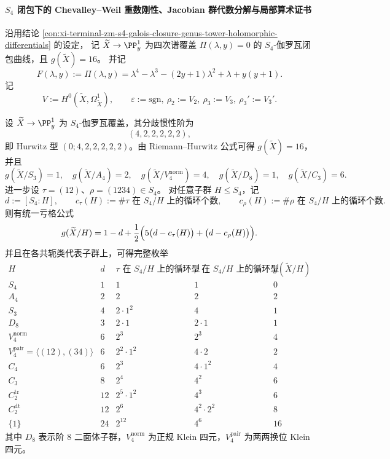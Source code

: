 \paragraph{\texorpdfstring{$S_4$}{S4} 闭包下的 Chevalley--Weil 重数刚性、Jacobian 群代数分解与局部算术证书}
沿用结论 \ref{con:xi-terminal-zm-s4-galois-closure-genus-tower-holomorphic-differentials} 的设定，
记 \(\widetilde{X}\to \PP^1_y\) 为四次谱覆盖 \(\Pi(\lambda,y)=0\) 的 \(S_4\)-伽罗瓦闭包曲线，且 \(g(\widetilde{X})=16\)。
并记
\[
F(\lambda,y):=\Pi(\lambda,y)
=\lambda^{4}-\lambda^{3}-(2y+1)\lambda^{2}+\lambda+y(y+1).
\]
记
\[
V:=H^0(\widetilde{X},\Omega^1_{\widetilde{X}}),
\qquad
\varepsilon:=\mathrm{sgn},\ \rho_2:=V_2,\ \rho_3:=V_3,\ \rho_3':=V_3'.
\]

\begin{conclusion}\label{con:xi-terminal-zm-s4-hurwitz-subgroup-spectrum-cycletypes}
设 \(\widetilde{X}\to\PP^1_y\) 为 \(S_4\)-伽罗瓦覆盖，其分歧惯性阶为
\[
(4,2,2,2,2,2),
\]
即 Hurwitz 型 \((0;4,2,2,2,2,2)\)。由 Riemann--Hurwitz 公式可得 \(g(\widetilde{X})=16\)，并且
\[
g(\widetilde{X}/S_3)=1,\quad
g(\widetilde{X}/A_4)=2,\quad
g(\widetilde{X}/V_4^{\mathrm{norm}})=4,\quad
g(\widetilde{X}/D_8)=1,\quad
g(\widetilde{X}/C_3)=6.
\]
进一步设 \(\tau=(12)\)、\(\rho=(1234)\in S_4\)。
对任意子群 \(H\le S_4\)，记
\[
d:=[S_4:H],\qquad
c_\tau(H):=\#\text{\(\tau\) 在 }S_4/H\text{ 上的循环个数},\qquad
c_\rho(H):=\#\text{\(\rho\) 在 }S_4/H\text{ 上的循环个数}.
\]
则有统一亏格公式
\[
g(\widetilde{X}/H)
=1-d+\frac12\Bigl(5\bigl(d-c_\tau(H)\bigr)+\bigl(d-c_\rho(H)\bigr)\Bigr).
\]
并且在各共轭类代表子群上，可得完整枚举
\[
\begin{array}{c|c|c|c|c}
H & d & \tau\text{ 在 }S_4/H\text{ 上的循环型} & \rho\text{ 在 }S_4/H\text{ 上的循环型} & g(\widetilde{X}/H)\\
\hline
S_4 & 1 & 1 & 1 & 0\\
A_4 & 2 & 2 & 2 & 2\\
S_3 & 4 & 2\cdot 1^2 & 4 & 1\\
D_8 & 3 & 2\cdot 1 & 2\cdot 1 & 1\\
V_4^{\mathrm{norm}} & 6 & 2^3 & 2^3 & 4\\
V_4^{\mathrm{pair}}=\langle(12),(34)\rangle & 6 & 2^2\cdot 1^2 & 4\cdot 2 & 2\\
C_4 & 6 & 2^3 & 4\cdot 1^2 & 4\\
C_3 & 8 & 2^4 & 4^2 & 6\\
C_2^{\mathrm{tr}} & 12 & 2^5\cdot 1^2 & 4^3 & 6\\
C_2^{\mathrm{dt}} & 12 & 2^6 & 4^2\cdot 2^2 & 8\\
\{1\} & 24 & 2^{12} & 4^6 & 16
\end{array}
\]
其中 \(D_8\) 表示阶 \(8\) 二面体子群，\(V_4^{\mathrm{norm}}\) 为正规 Klein 四元，\(V_4^{\mathrm{pair}}\) 为两两换位 Klein 四元。
\end{conclusion}
